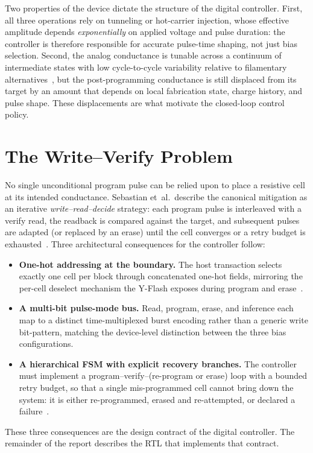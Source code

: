 Two properties of the device dictate the structure of the digital
controller. First, all three operations rely on tunneling or hot-carrier
injection, whose effective amplitude depends \emph{exponentially} on
applied voltage and pulse duration: the controller is therefore
responsible for accurate pulse-time shaping, not just bias selection.
Second, the analog conductance is tunable across a continuum of
intermediate states with low cycle-to-cycle variability relative to
filamentary alternatives~\cite{Wang2022YFlash}, but the post-programming
conductance is still displaced from its target by an amount that depends
on local fabrication state, charge history, and pulse shape. These
displacements are what motivate the closed-loop control policy.

\section{The Write--Verify Problem}
\label{sec:bg-writeverify}

No single unconditional program pulse can be relied upon to place a
resistive cell at its intended conductance. Sebastian et~al.\ describe
the canonical mitigation as an iterative \emph{write--read--decide}
strategy: each program pulse is interleaved with a verify read, the
readback is compared against the target, and subsequent pulses are
adapted (or replaced by an erase) until the cell converges or a retry
budget is exhausted~\cite{Sebastian2020IMC, Ielmini2018RRAM,
Wang2022YFlash}. Three architectural consequences for the controller
follow:

\begin{itemize}
    \item \textbf{One-hot addressing at the boundary.} The host
          transaction selects exactly one cell per block through
          concatenated one-hot fields, mirroring the per-cell deselect
          mechanism the Y-Flash exposes during program and
          erase~\cite{Wang2022YFlash}.
    \item \textbf{A multi-bit pulse-mode bus.} Read, program, erase, and
          inference each map to a distinct time-multiplexed burst encoding
          rather than a generic write bit-pattern, matching the
          device-level distinction between the three bias
          configurations.
    \item \textbf{A hierarchical FSM with explicit recovery branches.}
          The controller must implement a program--verify--(re-program or
          erase) loop with a bounded retry budget, so that a single
          mis-programmed cell cannot bring down the system: it is either
          re-programmed, erased and re-attempted, or declared a
          failure~\cite{Ielmini2018RRAM, Sebastian2020IMC,
          Wang2022YFlash}.
\end{itemize}

These three consequences are the design contract of the digital
controller. The remainder of the report describes the RTL that implements
that contract.
